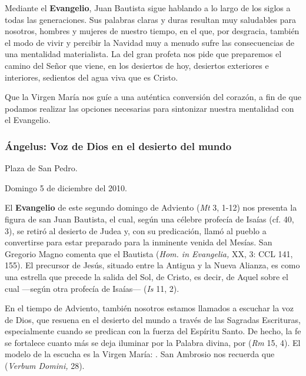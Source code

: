 Mediante el \textbf{Evangelio}, Juan Bautista sigue hablando a lo largo de los siglos a todas las generaciones. Sus palabras claras y duras resultan muy saludables para nosotros, hombres y mujeres de nuestro tiempo, en el que, por desgracia, también el modo de vivir y percibir la Navidad muy a menudo sufre las consecuencias de una mentalidad materialista. La  del gran profeta nos pide que preparemos el camino del Señor que viene, en los desiertos de hoy, desiertos exteriores e interiores, sedientos del agua viva que es Cristo.

Que la Virgen María nos guíe a una auténtica conversión del corazón, a fin de que podamos realizar las opciones necesarias para sintonizar nuestra mentalidad con el Evangelio.

\subsubsection{Ángelus: Voz de Dios en el desierto del mundo}

Plaza de San Pedro.

Domingo 5 de diciembre del 2010.

El \textbf{Evangelio} de este segundo domingo de Adviento (\emph{Mt} 3, 1-12) nos presenta la figura de san Juan Bautista, el cual, según una célebre profecía de Isaías (cf. 40, 3), se retiró al desierto de Judea y, con su predicación, llamó al pueblo a convertirse para estar preparado para la inminente venida del Mesías. San Gregorio Magno comenta que el Bautista  (\emph{Hom. in Evangelia,} XX, 3: CCL 141, 155). El precursor de Jesús, situado entre la Antigua y la Nueva Alianza, es como una estrella que precede la salida del Sol, de Cristo, es decir, de Aquel sobre el cual ---según otra profecía de Isaías---  (\emph{Is} 11, 2).

En el tiempo de Adviento, también nosotros estamos llamados a escuchar la voz de Dios, que resuena en el desierto del mundo a través de las Sagradas Escrituras, especialmente cuando se predican con la fuerza del Espíritu Santo. De hecho, la fe se fortalece cuanto más se deja iluminar por la Palabra divina, por  (\emph{Rm} 15, 4). El modelo de la escucha es la Virgen María: . San Ambrosio nos recuerda que  (\emph{Verbum Domini,} 28).

